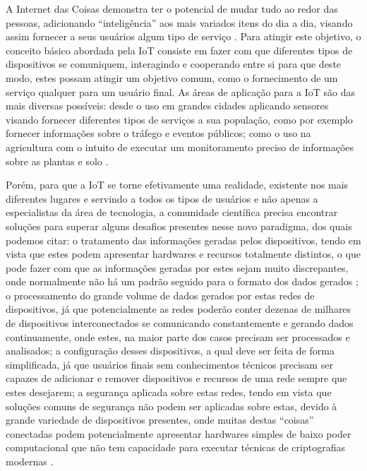 \documentclass[ti,table]{texufpel} %
\begin{document}
A Internet das Coisas demonstra ter o potencial de mudar tudo ao redor das pessoas, adicionando ``inteligência'' aos mais variados itens do dia a dia, visando assim fornecer a seus usuários algum tipo de serviço \cite{bandyopadhyay2011internet}. Para atingir este objetivo, o conceito básico abordada pela IoT consiste em fazer com que diferentes tipos de dispositivos se comuniquem, interagindo e cooperando entre si para que deste modo, estes possam atingir um objetivo comum, como o fornecimento de um serviço qualquer para um usuário final. As áreas de aplicação para a IoT são das mais diversas possíveis: desde o uso em grandes cidades aplicando sensores visando fornecer diferentes tipos de serviços a sua população, como por exemplo fornecer informações sobre o tráfego e eventos públicos; como o uso na agricultura com o intuito de executar um monitoramento preciso de  informações sobre as plantas e solo \cite{gonccalves2017research}. 

  

Porém, para que a IoT se torne efetivamente uma realidade, existente nos mais diferentes lugares e servindo a todos os tipos de usuários e não apenas a especialistas da área de tecnologia, a comunidade científica precisa encontrar soluções para superar alguns desafios presentes nesse novo paradigma, dos quais podemos citar: o tratamento das informações geradas pelos dispositivos, tendo em vista que estes podem apresentar hardwares e recursos totalmente distintos, o que pode fazer com que as informações geradas por estes sejam muito discrepantes, onde normalmente não há um padrão seguido para o formato dos dados gerados \cite{agrawal2013survey}; o processamento do grande volume de dados gerados por estas redes de dispositivos, já que potencialmente as redes poderão conter dezenas de milhares de dispositivos interconectados se comunicando constantemente e gerando dados continuamente, onde estes, na maior parte dos casos precisam ser processados e analisados; a configuração desses dispositivos, a qual deve ser feita de forma simplificada, já que usuários finais sem conhecimentos técnicos precisam ser capazes de adicionar e remover dispositivos e recursos de uma rede sempre que estes desejarem; a segurança aplicada sobre estas redes, tendo em vista que soluções comuns de segurança não podem ser aplicadas sobre estas,  devido à grande variedade de dispositivos presentes, onde muitas destas ``coisas'' conectadas podem potencialmente apresentar hardwares simples de baixo poder computacional que não tem capacidade para executar técnicas de criptografias modernas \cite{agrawal2013survey}. 
\end{document}
